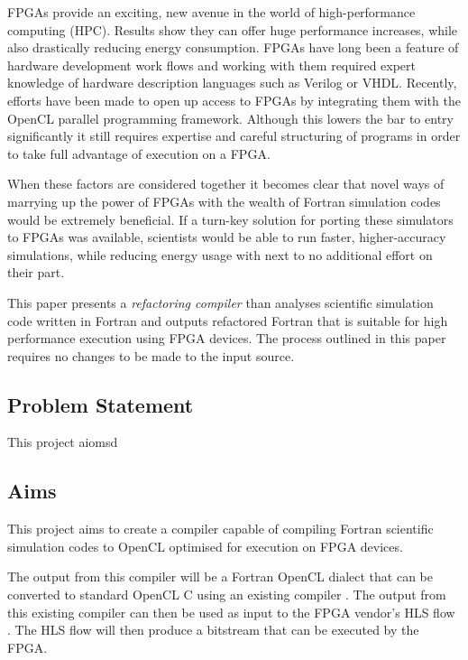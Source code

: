 \documentclass{mpaper}
\begin{document}
FPGAs provide an exciting, new avenue in the world of high-performance computing (HPC). Results show they can offer huge performance increases, while also drastically reducing energy consumption. FPGAs have long been a feature of hardware development work flows and working with them required expert knowledge of hardware description languages such as Verilog or VHDL. Recently, efforts have been made to open up access to FPGAs by integrating them with the OpenCL parallel programming framework. Although this lowers the bar to entry significantly it still requires expertise and careful structuring of programs in order to take full advantage of execution on a FPGA.

When these factors are considered together it becomes clear that novel ways of marrying up the power of FPGAs with the wealth of Fortran simulation codes would be extremely beneficial. If a turn-key solution for porting these simulators to FPGAs was available, scientists would be able to run faster, higher-accuracy simulations, while reducing energy usage with next to no additional effort on their part.

This paper presents a \textit{refactoring compiler} than analyses scientific simulation code written in Fortran and outputs refactored Fortran that is suitable for high performance execution using FPGA devices. The process outlined in this paper requires no changes to be made to the input source.

\subsection{Problem Statement}

This project aiomsd

\subsection{Aims}

This project aims to create a compiler capable of compiling Fortran scientific simulation codes to OpenCL optimised for execution on FPGA devices.

The output from this compiler will be a Fortran OpenCL dialect that can be converted to standard OpenCL C using an existing compiler \cite{VanderbauwhedeDavidson2018}. The output from this existing compiler can then be used as input to the FPGA vendor's HLS flow \cite{IntelCorporation, Xilinx}. The HLS flow will then produce a bitstream that can be executed by the FPGA.
\end{document}
